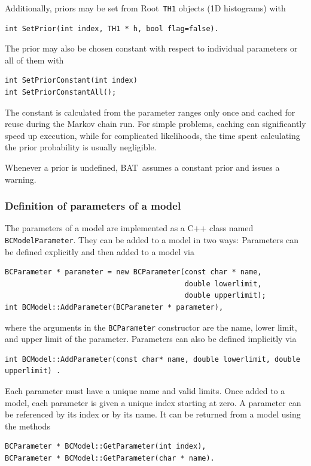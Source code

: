 \documentclass[11pt, a4paper]{article}
\newcommand{\bat}{{\sc BAT}}
\newcommand{\Root}{{\sc Root}}
\newcommand{\code}[1]{\texttt{#1}}
\begin{document}
Additionally, priors may be set from \Root\ \code{TH1} objects (1D
histograms) with
\begin{verbatim}
int SetPrior(int index, TH1 * h, bool flag=false).
\end{verbatim}
%

The prior may also be chosen constant with respect to individual
parameters or all of them with
%
\begin{verbatim}
int SetPriorConstant(int index)
int SetPriorConstantAll();
\end{verbatim}
%
The constant is calculated from the parameter ranges only once and
cached for reuse during the Markov chain run. For simple problems,
caching can significantly speed up execution, while for complicated
likelihoods, the time spent calculating the prior probability is
usually negligible.

Whenever a prior is undefined, \bat\ assumes a constant prior and
issues a warning.


\subsubsection{Definition of parameters of a model}
\label{subsubsection:parameters}

The parameters of a model are implemented as a C++ class named
\verb|BCModelParameter|. They can be added to a model in two ways:
Parameters can be defined explicitly and then added to a model via
%
\begin{verbatim}
BCParameter * parameter = new BCParameter(const char * name,
                                          double lowerlimit,
                                          double upperlimit);
int BCModel::AddParameter(BCParameter * parameter),
\end{verbatim}
%
where the arguments in the \code{BCParameter} constructor are the
name, lower limit, and upper limit of the parameter. Parameters can
also be defined implicitly via
%
\begin{verbatim}
int BCModel::AddParameter(const char* name, double lowerlimit, double upperlimit) .
\end{verbatim}

Each parameter must have a unique name and valid limits. Once added to
a model, each parameter is given a unique index starting at zero. A
parameter can be referenced by its index or by its name. It can be
returned from a model using the methods
%
\begin{verbatim}
BCParameter * BCModel::GetParameter(int index),
BCParameter * BCModel::GetParameter(char * name).
\end{verbatim}
\end{document}
